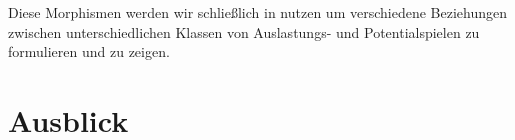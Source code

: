 \documentclass[a4paper,ngerman,11pt,bibliography=totoc]{scrartcl}
\theoremstyle{definition}
\theoremstyle{plain}
\theoremstyle{remark}
\begin{document}

Diese Morphismen werden wir schließlich in  nutzen um verschiedene Beziehungen zwischen unterschiedlichen Klassen von Auslastungs- und Potentialspielen zu formulieren und zu zeigen.







{}
\section*{Ausblick}



\newpage
\nocite{*}
\printbibliography
\end{document}
